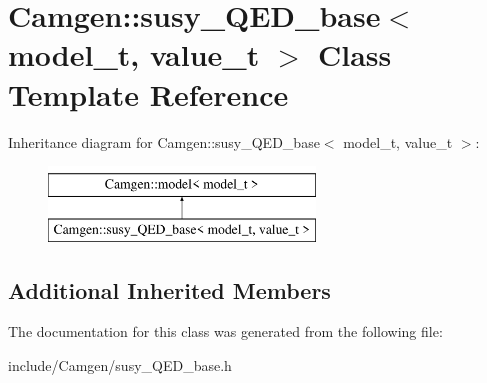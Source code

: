 \hypertarget{a00518}{\section{Camgen\-:\-:susy\-\_\-\-Q\-E\-D\-\_\-base$<$ model\-\_\-t, value\-\_\-t $>$ Class Template Reference}
\label{a00518}
}
Inheritance diagram for Camgen\-:\-:susy\-\_\-\-Q\-E\-D\-\_\-base$<$ model\-\_\-t, value\-\_\-t $>$\-:\begin{figure}[H]
\begin{center}
\leavevmode
\includegraphics[height=2.000000cm]{a00518}
\end{center}
\end{figure}
\subsection*{Additional Inherited Members}


The documentation for this class was generated from the following file\-:\begin{DoxyCompactItemize}
\item 
include/\-Camgen/susy\-\_\-\-Q\-E\-D\-\_\-base.\-h\end{DoxyCompactItemize}
